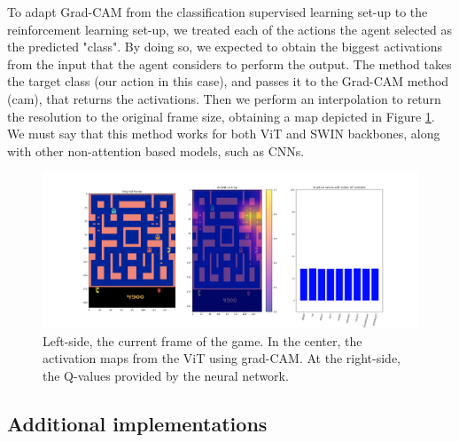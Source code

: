 To adapt Grad-CAM from the classification supervised learning set-up to the reinforcement learning set-up, we treated each of the actions the agent selected as the predicted "class". By doing so, we expected to obtain the biggest activations from the input that the agent considers to perform the output. The  method takes the target class (our action in this case), and passes it to the Grad-CAM method (cam), that returns the activations. Then we perform an interpolation to return the resolution to the original frame size, obtaining a map depicted in Figure \ref{fig:activationmapsvisualization}. We must say that this method works for both ViT and SWIN backbones, along with other non-attention based models, such as CNNs. 

\begin{figure}[!h]
	\centering
	\includegraphics[width=\linewidth]{figures/activation_maps_visualization}
	\caption{Left-side, the current frame of the game. In the center, the activation maps from the ViT using grad-CAM. At the right-side, the Q-values provided by the neural network.}
	\label{fig:activationmapsvisualization}
\end{figure}

\subsection{Additional implementations}

